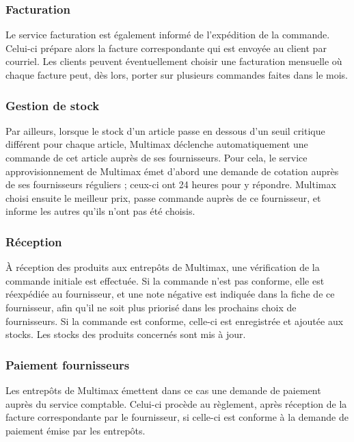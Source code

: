 \documentclass[a4paper,12pt]{article}
\begin{document}
\subsubsection*{Facturation}
Le service facturation est également informé de l'expédition de la commande. Celui-ci prépare alors la facture correspondante qui est envoyée au client par courriel. Les clients peuvent éventuellement choisir une facturation mensuelle où chaque facture peut, dès lors, porter sur plusieurs commandes faites dans le mois.
\subsubsection*{Gestion de stock}
Par ailleurs, lorsque le stock d'un article passe en dessous d'un seuil critique différent pour chaque article, Multimax déclenche automatiquement une commande de cet article auprès de ses fournisseurs.
Pour cela, le service approvisionnement de Multimax émet d'abord une demande de cotation auprès de ses fournisseurs réguliers ; ceux-ci ont 24 heures pour y répondre.
Multimax choisi ensuite le meilleur prix, passe commande auprès de ce fournisseur, et informe les autres qu'ils n'ont pas été choisis.
\subsubsection*{Réception}
À réception des produits aux entrepôts de Multimax, une vérification de la commande initiale est effectuée.
Si la commande n'est pas conforme, elle est réexpédiée au fournisseur, et une note négative est indiquée dans la fiche de ce fournisseur, afin qu'il ne soit plus priorisé dans les prochains choix de fournisseurs.
Si la commande est conforme, celle-ci est enregistrée et ajoutée aux stocks. Les stocks des produits concernés sont mis à jour.
\subsubsection*{Paiement fournisseurs}
Les entrepôts de Multimax émettent dans ce cas une demande de paiement auprès du service comptable. Celui-ci procède au règlement, après réception de la facture correspondante par le fournisseur, si celle-ci est conforme à la demande de paiement émise par les entrepôts.
\end{document}

